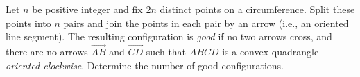 Let $n$ be positive integer and fix $2n$ distinct points on a circumference. Split these points into $n$ pairs and join the points in each pair by an arrow (i.e., an oriented line segment). The resulting configuration is \emph{good} if no two arrows cross, and there are no arrows $\overrightarrow{AB}$ and $\overrightarrow{CD}$ such that $ABCD$ is a convex quadrangle \emph{oriented clockwise}. Determine the number of good configurations.
